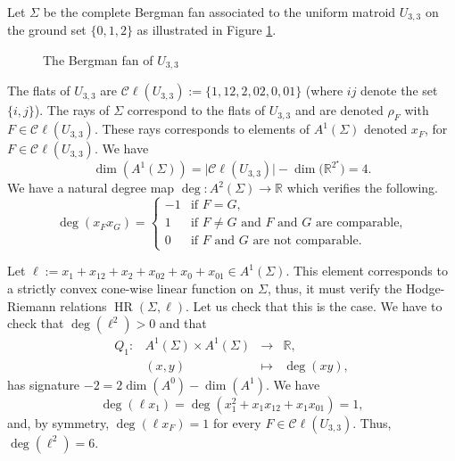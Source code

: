 \documentclass[11pt]{amsart}
\theoremstyle{definition}
\numberwithin{equation}{section}
\renewcommand{\~}{\widetilde}
\newcommand{\R}{\mathbb{R}}
\DeclareMathOperator{\HR}{HR} %
\newcommand{\Cl}{\mathcal C\!\ell} %
\newcommand{\dual}{\star} %
\newcommand{\card}[1]{\lvert#1\rvert} %
\begin{document}
\subsubsection{} Let $\Sigma$ be the complete Bergman fan associated to the uniform matroid $U_{3,3}$ on the ground set $\{0,1,2\}$ as illustrated in Figure \ref{fig:Bergman_fan_U33}.
%
\begin{figure}[ht]
\caption{The Bergman fan of $U_{3,3}$} \label{fig:Bergman_fan_U33}
\end{figure}
%
The flats of $U_{3,3}$ are $\Cl(U_{3,3}):=\{1,12,2,02,0,01\}$ (where $ij$ denote the set $\{i,j\}$). The rays of $\Sigma$ correspond to the flats of $U_{3,3}$ and are denoted $\rho_F$ with $F\in\Cl(U_{3,3})$. These rays corresponds to elements of $A^1(\Sigma)$ denoted $x_F$, for $F\in\Cl(U_{3,3})$. We have
\[ \dim(A^1(\Sigma))=\card{\Cl(U_{3,3})}-\dim\bigl(\R^{2^\dual}\bigr)=4. \]
We have a natural degree map $\deg\colon A^2(\Sigma)\to\R$ which verifies the following.
\[ \deg(x_Fx_G)=\begin{cases}
  -1 & \text{if $F=G$,} \\
  1  & \text{if $F\neq G$ and $F$ and $G$ are comparable,} \\
  0  & \text{if $F$ and $G$ are not comparable.}
\end{cases} \]

\medskip

Let $\ell:=x_{1}+x_{12}+x_{2}+x_{02}+x_{0}+x_{01}\in A^1(\Sigma)$. This element corresponds to a strictly convex cone-wise linear function on $\Sigma$, thus, it must verify the Hodge-Riemann relations $\HR(\Sigma,\ell)$. Let us check that this is the case. We have to check that $\deg(\ell^2)>0$ and that
\[ \begin{array}{rccc}
Q_1\colon & A^1(\Sigma)  \times  A^1(\Sigma) & \to     & \R,       \\
          &( x            ,       y )        & \mapsto & \deg(xy),
\end{array} \]
has signature $-2=2\dim(A^0)-\dim(A^1)$. We have
\[ \deg(\ell x_1)=\deg(x_1^2+x_1x_{12}+x_1x_{01})=1, \]
and, by symmetry, $\deg(\ell x_F)=1$ for every $F\in\Cl(U_{3,3})$. Thus, $\deg(\ell^2)=6$.
\end{document}
